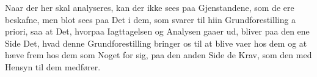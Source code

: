 \documentclass[12pt]{book}
\def\textit#1{#1}%
\def\emph#1{#1}%
\begin{document}
Naar der her skal analyseres, kan der ikke sees paa Gjenstandene, som de ere
beskafne, men blot sees paa Det i dem, som svarer til hiin Grundforestilling
\textit{a priori}, saa at Det, hvorpaa Iagttagelsen og Analysen gaaer ud, bliver
paa den ene Side Det, hvad denne Grundforestilling bringer os til at blive vaer
hos dem og at hæve frem hos dem som Noget for sig, paa den anden Side de
\emph{Krav}, som den med Hensyn til dem medfører.
\end{document}
